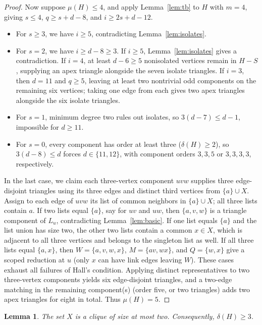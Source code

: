 \documentclass[11pt]{article}
\newtheorem{lemma}[theorem]{Lemma}
\begin{document}
\begin{proof}
Now suppose $\mu(H)\leq 4$, and apply Lemma~\ref{lem:tb} to $H$ with $m=4$, giving $s\leq 4$, $q\geq s+d-8$, and $i\geq 2s+d-12$.
\begin{itemize}
\item For $s\geq 3$, we have $i\geq 5$, contradicting Lemma~\ref{lem:isolates}.
\item For $s=2$, we have $i\geq d-8\geq 3$. If $i\geq 5$, Lemma~\ref{lem:isolates} gives a contradiction. If $i=4$, at least $d-6\geq 5$ nonisolated vertices remain in $H-S$, supplying an apex triangle alongside the seven isolate triangles. If $i=3$, then $d=11$ and $q\geq 5$, leaving at least two nontrivial odd components on the remaining six vertices; taking one edge from each gives two apex triangles alongside the six isolate triangles.
\item For $s=1$, minimum degree two rules out isolates, so $3(d-7)\leq d-1$, impossible for $d\geq 11$.
\item For $s=0$, every component has order at least three ($\delta(H)\geq 2$), so $3(d-8)\leq d$ forces $d\in\{11,12\}$, with component orders $3,3,5$ or $3,3,3,3$, respectively.
\end{itemize}
In the last case, we claim each three-vertex component $uvw$ supplies three edge-disjoint triangles using its three edges and distinct third vertices from $\{a\}\cup X$. Assign to each edge of $uvw$ its list of common neighbors in $\{a\}\cup X$; all three lists contain $a$. If two lists equal $\{a\}$, say for $uv$ and $uw$, then $\{a,v,w\}$ is a triangle component of $L_u$, contradicting Lemma~\ref{lem:basic}. If one list equals $\{a\}$ and the list union has size two, the other two lists contain a common $x\in X$, which is adjacent to all three vertices and belongs to the singleton list as well. If all three lists equal $\{a,x\}$, then $W=\{a,v,w,x\}$, $M=\{av,wx\}$, and $Q=\{w,x\}$ give a scoped reduction at $u$ (only $x$ can have link edges leaving $W$). These cases exhaust all failures of Hall's condition. Applying distinct representatives to two three-vertex components yields six edge-disjoint triangles, and a two-edge matching in the remaining component(s) (order five, or two triangles) adds two apex triangles for eight in total. Thus $\mu(H)=5$.
\end{proof}

\begin{lemma}\label{lem:X-small}
The set $X$ is a clique of size at most two. Consequently, $\delta(H)\geq 3$.
\end{lemma}
\end{document}
